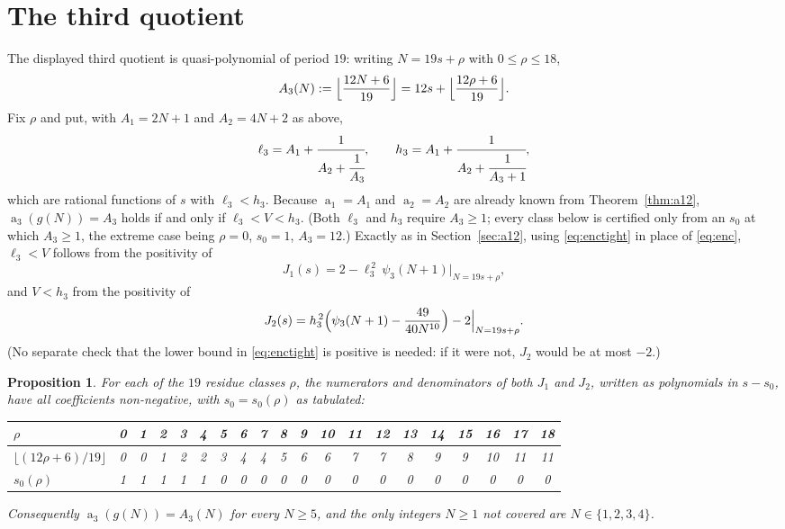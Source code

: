 \documentclass[11pt]{amsart}
\newtheorem{proposition}[theorem]{Proposition}
\theoremstyle{definition}
\theoremstyle{remark}
\DeclareMathOperator{\PQ}{a}
\newcommand{\pss}{\psi_3}
\begin{document}
\section{The third quotient}\label{sec:a3}

The displayed third quotient is quasi-polynomial of period $19$: writing
$N=19s+\rho$ with $0\le\rho\le18$,
\begin{equation}\label{eq:A3}
 A_3(N):=\Bigl\lfloor\frac{12N+6}{19}\Bigr\rfloor
 =12s+\Bigl\lfloor\frac{12\rho+6}{19}\Bigr\rfloor .
\end{equation}
Fix $\rho$ and put, with $A_1=2N+1$ and $A_2=4N+2$ as above,
\[
 \ell_3=A_1+\cfrac1{A_2+\cfrac1{A_3}},
 \qquad
 h_3=A_1+\cfrac1{A_2+\cfrac1{A_3+1}} ,
\]
which are rational functions of $s$ with $\ell_3<h_3$. Because
$\PQ_1=A_1$ and $\PQ_2=A_2$ are already known from Theorem~\ref{thm:a12},
$\PQ_3(g(N))=A_3$ holds if and only if $\ell_3<V<h_3$. (Both $\ell_3$ and $h_3$
require $A_3\ge1$; every class below is certified only from an $s_0$ at which
$A_3\ge1$, the extreme case being $\rho=0$, $s_0=1$, $A_3=12$.) Exactly as in
Section~\ref{sec:a12}, using \eqref{eq:enctight} in place of \eqref{eq:enc},
$\ell_3<V$ follows from the positivity of
\[
 J_1(s)=2-\ell_3^{\,2}\,\pss(N+1)\Big|_{N=19s+\rho},
\]
and $V<h_3$ from the positivity of
\[
 J_2(s)=h_3^{\,2}\Bigl(\pss(N+1)-\frac{49}{40N^{10}}\Bigr)-2\Big|_{N=19s+\rho}.
\]
(No separate check that the lower bound in \eqref{eq:enctight} is positive is
needed: if it were not, $J_2$ would be at most $-2$.)

\begin{proposition}\label{prop:classes}
For each of the $19$ residue classes $\rho$, the numerators and denominators of
both $J_1$ and $J_2$, written as polynomials in $s-s_0$, have all coefficients
non-negative, with $s_0=s_0(\rho)$ as tabulated:
\begin{center}
\normalfont
\setlength{\tabcolsep}{2.5pt}
\footnotesize
\begin{tabular}{l|ccccccccccccccccccc}
 $\rho$ & 0&1&2&3&4&5&6&7&8&9&10&11&12&13&14&15&16&17&18\\
 \hline
 $\lfloor(12\rho+6)/19\rfloor$
         & 0&0&1&2&2&3&4&4&5&6&6&7&7&8&9&9&10&11&11\\
 $s_0(\rho)$
         & 1&1&1&1&1&0&0&0&0&0&0&0&0&0&0&0&0&0&0\\
\end{tabular}
\end{center}
Consequently $\PQ_3(g(N))=A_3(N)$ for every $N\ge5$, and the only integers
$N\ge1$ not covered are $N\in\{1,2,3,4\}$.
\end{proposition}
\end{document}

